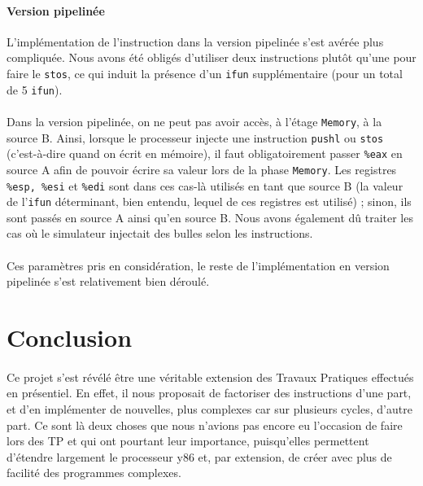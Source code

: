 \documentclass[12pt]{article}
\begin{document}
\paragraph{Version pipelinée}L'implémentation de l'instruction dans la version pipelinée s'est avérée plus compliquée. Nous avons été obligés d'utiliser deux instructions plutôt qu'une pour faire le \verb+stos+, ce qui induit la présence d'un \verb+ifun+ supplémentaire (pour un total de 5 \verb+ifun+).

\paragraph{}Dans la version pipelinée, on ne peut pas avoir accès, à l'étage \verb+Memory+, à la source B. Ainsi, lorsque le processeur injecte une instruction \verb+pushl+ ou \verb+stos+ (c'est-à-dire quand on écrit en mémoire), il faut obligatoirement passer \verb+%eax+ en source A afin de pouvoir écrire sa valeur lors de la phase \verb+Memory+. Les registres \verb+%esp, %esi+ et \verb+%edi+ sont dans ces cas-là utilisés en tant que source B (la valeur de l'\verb+ifun+ déterminant, bien entendu, lequel de ces registres est utilisé) ; sinon, ils sont passés en source A ainsi qu'en source B. Nous avons également dû traiter les cas où le simulateur injectait des bulles selon les instructions.

\paragraph{}Ces paramètres pris en considération, le reste de l'implémentation en version pipelinée s'est relativement bien déroulé.



\section*{Conclusion}
\paragraph{}Ce projet s'est révélé être une véritable extension des Travaux Pratiques effectués en présentiel. En effet, il nous proposait de factoriser des instructions d'une part, et d'en implémenter de nouvelles, plus complexes car sur plusieurs cycles, d'autre part. Ce sont là deux choses que nous n'avions pas encore eu l'occasion de faire lors des TP et qui ont pourtant leur importance, puisqu'elles permettent d'étendre largement le processeur y86 et, par extension, de créer avec plus de facilité des programmes complexes.
\end{document}

